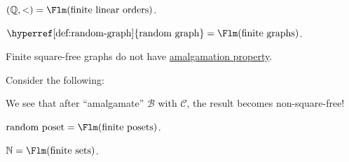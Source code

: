 \begin{eg}
	\((\mathbb{Q} , <)=\Flm(\text{finite linear orders})\).
\end{eg}

\begin{eg}
	\(\text{\hyperref[def:random-graph]{random graph}} = \Flm(\text{finite graphs}) \).
\end{eg}


\begin{eg}
	Finite square-free graphs do not have \hyperref[def:AP]{amalgamation property}.
\end{eg}
\begin{explanation}
	Consider the following:
	\begin{center}
	\end{center}
	We see that after ``amalgamate'' \(\mathcal{B} \) with \(\mathcal{C} \), the result becomes non-square-free!
\end{explanation}

\begin{eg}
	\(\text{random poset} = \Flm(\text{finite posets})\).
\end{eg}

\begin{eg}
	\(\mathbb{N} = \Flm(\text{finite sets})\).
\end{eg}


